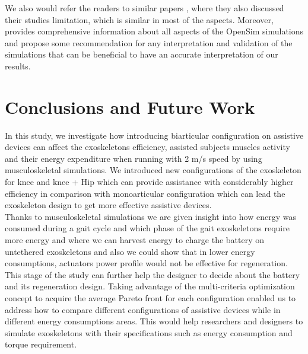 \documentclass[10pt,letterpaper]{article}
\begin{document}
We also would refer the readers to similar papers \cite{2,93}, where they also discussed their studies limitation, which is similar in most of the aspects. Moreover,\cite{92} provides comprehensive information about all aspects of the OpenSim simulations and propose some recommendation for any interpretation and validation of the simulations that can be beneficial to have an accurate interpretation of our results.
\section*{Conclusions and Future Work}
In this study, we investigate how introducing biarticular configuration on assistive devices can affect the exoskeletons efficiency, assisted subjects muscles activity and their energy expenditure when running with 2 m/s speed by using musculoskeletal simulations. We introduced new configurations of the exoskeleton for knee and knee + Hip which can provide assistance with considerably higher efficiency in comparison with monoarticular configuration which can lead the exoskeleton design to get more effective assistive devices.\\
Thanks to musculoskeletal simulations we are given insight into how energy was consumed during a gait cycle and which phase of the gait exoskeletons require more energy and where we can harvest energy to charge the battery on untethered exoskeletons and also we could show that in lower energy consumptions, actuators power profile would not be effective for regeneration. This stage of the study can further help the designer to decide about the battery and its regeneration design.
Taking advantage of the multi-criteria optimization concept to acquire the average Pareto front for each configuration enabled us to address how to compare different configurations of assistive devices while in different energy consumptions areas. This would help researchers and designers to simulate exoskeletons with their specifications such as energy consumption and torque requirement.\\
\end{document}
